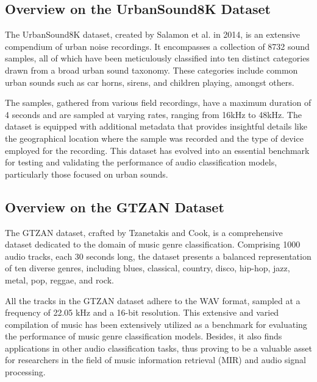 \documentclass[runningheads]{llncs}
\begin{document}
\subsection{Overview on the UrbanSound8K Dataset}
The UrbanSound8K dataset, created by Salamon et al. in 2014, is an extensive compendium of urban noise recordings. It encompasses a collection of 8732 sound samples, all of which have been meticulously classified into ten distinct categories drawn from a broad urban sound taxonomy. These categories include common urban sounds such as car horns, sirens, and children playing, amongst others.

The samples, gathered from various field recordings, have a maximum duration of 4 seconds and are sampled at varying rates, ranging from 16kHz to 48kHz. The dataset is equipped with additional metadata that provides insightful details like the geographical location where the sample was recorded and the type of device employed for the recording. This dataset has evolved into an essential benchmark for testing and validating the performance of audio classification models, particularly those focused on urban sounds.

\subsection{Overview on the GTZAN Dataset}
The GTZAN dataset, crafted by Tzanetakis and Cook, is a comprehensive dataset dedicated to the domain of music genre classification. Comprising 1000 audio tracks, each 30 seconds long, the dataset presents a balanced representation of ten diverse genres, including blues, classical, country, disco, hip-hop, jazz, metal, pop, reggae, and rock.

All the tracks in the GTZAN dataset adhere to the WAV format, sampled at a frequency of 22.05 kHz and a 16-bit resolution. This extensive and varied compilation of music has been extensively utilized as a benchmark for evaluating the performance of music genre classification models. Besides, it also finds applications in other audio classification tasks, thus proving to be a valuable asset for researchers in the field of music information retrieval (MIR) and audio signal processing.
\end{document}
